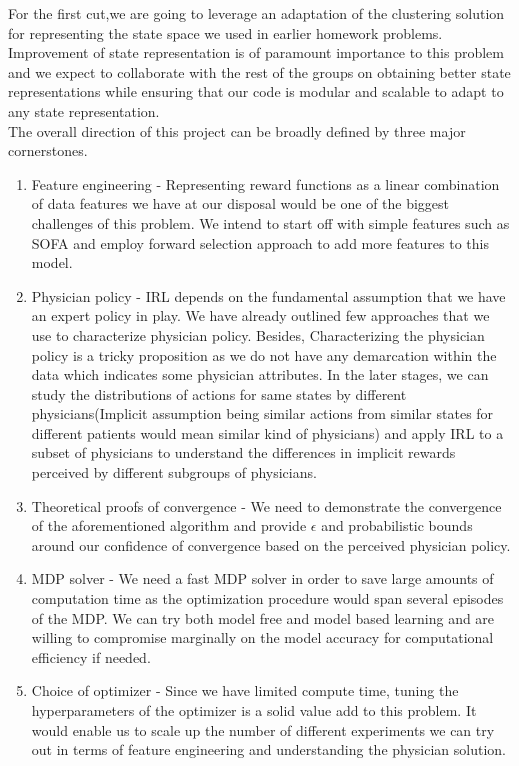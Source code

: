 \documentclass[twoside,11pt]{article}
\begin{document}
For the first cut,we are going to leverage an adaptation of the clustering solution for representing the state space we used in earlier homework problems. Improvement of state representation is of paramount importance to this problem and we expect to collaborate with the rest of the groups on obtaining better state representations while ensuring that our code is modular and scalable to adapt to any state representation. \\[10pt]
The overall direction of this project can be broadly defined by three major cornerstones.
\begin{enumerate}
\item Feature engineering - Representing reward functions as a linear combination of data features we have at our disposal would be one of the biggest challenges of this problem. We intend to start off with simple features such as SOFA and employ forward selection approach to add more features to this model.
\item Physician policy - IRL depends on the fundamental assumption that we have an expert policy in play. We have already outlined few approaches that we use to characterize physician policy. Besides,  Characterizing the physician policy is a tricky proposition as we do not have any demarcation within the data which indicates some physician attributes. In the later stages, we can study the distributions of actions for same states by different physicians(Implicit assumption being similar actions from similar states for different patients would mean similar kind of physicians) and apply IRL to a subset of physicians to understand the differences in implicit rewards perceived by different subgroups of physicians. 
\item Theoretical proofs of convergence -  We need to demonstrate the convergence of the aforementioned algorithm and provide $\epsilon$ and probabilistic bounds around our confidence of convergence based on the perceived physician policy.
\item MDP solver - We need a fast MDP solver in order to save large amounts of computation time as the optimization procedure would span several episodes of the MDP. We can try both model free and model based learning and are willing to compromise marginally on the model accuracy for computational efficiency if needed.
\item Choice of optimizer - Since we have limited compute time, tuning the hyperparameters of the optimizer is a solid value add to this problem. It would enable us to scale up the number of different experiments we can try out in terms of feature engineering and understanding the physician solution.
\end{enumerate}
\end{document}
